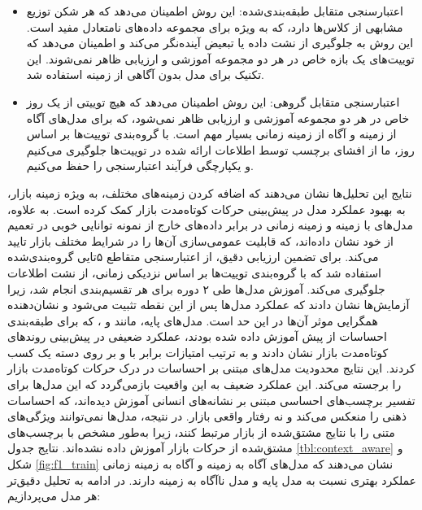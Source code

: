 \begin{itemize}
    \item اعتبارسنجی متقابل طبقه‌بندی‌شده: این روش اطمینان می‌دهد که هر شکن توزیع مشابهی از کلاس‌ها دارد، که به ویژه برای مجموعه داده‌های نامتعادل مفید است. این روش به جلوگیری از نشت داده یا تبعیض آینده‌نگر می‌کند و اطمینان می‌دهد که توییت‌های یک بازه خاص در هر دو مجموعه آموزشی و ارزیابی ظاهر نمی‌شوند. این تکنیک برای مدل بدون آگاهی از زمینه استفاده شد.
    \item اعتبارسنجی متقابل گروهی: این روش اطمینان می‌دهد که هیچ توییتی از یک روز خاص در هر دو مجموعه آموزشی و ارزیابی ظاهر نمی‌شود، که برای مدل‌های آگاه از زمینه و آگاه از زمینه زمانی بسیار مهم است. با گروه‌بندی توییت‌ها بر اساس روز، ما از افشای برچسب توسط اطلاعات ارائه شده در توییت‌ها جلوگیری می‌کنیم و یکپارچگی فرآیند اعتبارسنجی را حفظ می‌کنیم.
\end{itemize}

نتایج این تحلیل‌ها نشان می‌دهند که اضافه کردن زمینه‌های مختلف، به ویژه زمینه بازار، به بهبود عملکرد مدل در پیش‌بینی حرکات کوتاه‌مدت بازار کمک کرده است. به علاوه، مدل‌های با زمینه و زمینه زمانی در برابر داده‌های خارج از نمونه توانایی خوبی در تعمیم از خود نشان داده‌اند، که قابلیت عمومی‌سازی آن‌ها را در شرایط مختلف بازار تایید می‌کند. برای تضمین ارزیابی دقیق، از اعتبارسنجی متقاطع ۵‌تایی گروه‌بندی‌شده استفاده شد که با گروه‌بندی توییت‌ها بر اساس نزدیکی زمانی، از نشت اطلاعات جلوگیری می‌کند. آموزش مدل‌ها طی ۲ دوره برای هر تقسیم‌بندی انجام شد، زیرا آزمایش‌ها نشان دادند که عملکرد مدل‌ها پس از این نقطه تثبیت می‌شود و نشان‌دهنده همگرایی موثر آن‌ها در این حد است. مدل‌های پایه، مانند \cite{finbert_huang_2022} و \cite{sentiment_kulakowski_2023}، که برای طبقه‌بندی احساسات از پیش آموزش داده شده بودند، عملکرد ضعیفی در پیش‌بینی روندهای کوتاه‌مدت بازار نشان دادند و به ترتیب امتیازات  برابر با  و  بر روی دسته یک کسب کردند. این نتایج محدودیت مدل‌های مبتنی بر احساسات در درک حرکات کوتاه‌مدت بازار را برجسته می‌کند. این عملکرد ضعیف به این واقعیت بازمی‌گردد که این مدل‌ها برای تفسیر برچسب‌های احساسی مبتنی بر نشانه‌های انسانی آموزش دیده‌اند، که احساسات ذهنی را منعکس می‌کند و نه رفتار واقعی بازار. در نتیجه، مدل‌ها نمی‌توانند ویژگی‌های متنی را با نتایج مشتق‌شده از بازار مرتبط کنند، زیرا به‌طور مشخص با برچسب‌های مشتق‌شده از حرکات بازار آموزش داده نشده‌اند. نتایج جدول \ref{tbl:context_aware} و شکل \ref{fig:f1_train} نشان می‌دهند که مدل‌های آگاه به زمینه و آگاه به زمینه زمانی عملکرد بهتری نسبت به مدل پایه و مدل نا‌آگاه به زمینه دارند. در ادامه به تحلیل دقیق‌تر هر مدل می‌پردازیم:


